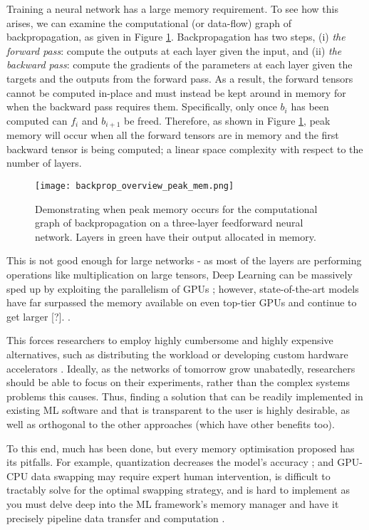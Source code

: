 Training a neural network has a large memory requirement. To see how this arises, we can examine the computational (or data-flow) graph of backpropagation, as given in Figure \ref{fig:1-backprop-peak-mem}. Backpropagation has two steps, (i) \textit{the forward pass}: compute the outputs at each layer given the input, and (ii) \textit{the backward pass}: compute the gradients of the parameters at each layer given the targets and the outputs from the forward pass. As a result, the forward tensors cannot be computed in-place and must instead be kept around in memory for when the backward pass requires them. Specifically, only once \(b_i\) has been computed can \(f_i\) and \(b_{i+1}\) be freed. Therefore, as shown in Figure \ref{fig:1-backprop-peak-mem}, peak memory will occur when all the forward tensors are in memory and the first backward tensor is being computed; a linear space complexity with respect to the number of layers.

\begin{figure}[t]
    \centering
    \texttt{[image: backprop\_overview\_peak\_mem.png]}
    \caption{Demonstrating when peak memory occurs for the computational graph of backpropagation on a three-layer feedforward neural network. Layers in green have their output allocated in memory.}
    \label{fig:1-backprop-peak-mem}
\end{figure}

This is not good enough for large networks - as most of the layers are performing operations like multiplication on large tensors, Deep Learning can be massively sped up by exploiting the parallelism of GPUs \cite{Kayid2018, Scanzio2010, Dogaru2017}; however, state-of-the-art models have far surpassed the memory available on even top-tier GPUs and continue to get larger [?]. .

This forces researchers to employ highly cumbersome and highly expensive alternatives, such as distributing the workload or developing custom hardware accelerators . Ideally, as the networks of tomorrow grow unabatedly, researchers should be able to focus on their experiments, rather than the complex systems problems this causes. Thus, finding a solution that can be readily implemented in existing ML software and that is transparent to the user is highly desirable, as well as orthogonal to the other approaches (which have other benefits too).

To this end, much has been done, but every memory optimisation proposed has its pitfalls. For example, quantization decreases the model's accuracy \cite{Zhou2016}; and GPU-CPU data swapping may require expert human intervention, is difficult to tractably solve for the optimal swapping strategy, and is hard to implement as you must delve deep into the ML framework's memory manager and have it precisely pipeline data transfer and computation \cite{Rhu2016, B, Zhang2019, Wang2018}.

